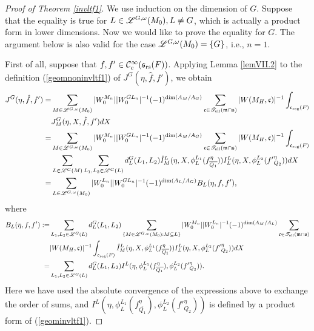 \documentclass[a4paper]{amsart}
\newcommand{\fm}{{\mathfrak{m}}} \newcommand{\fn}{{\mathfrak{n}}}\newcommand{\fo}{{\mathfrak{o}}} \newcommand{\fp}{{\mathfrak{p}}}
\newcommand{\ov}{\overline}
\theoremstyle{definition}
\theoremstyle{remark}
\numberwithin{equation}{subsection}
\begin{document}
\begin{proof}[Proof of Theorem \ref{invltf1}]
We use induction on the dimension of $G$. Suppose that the equality is true for $L\in\mathscr{L}^{G,\omega}(M_0), L\neq G$, which is actually a product form in lower dimensions. Now we would like to prove the equality for $G$. The argument below is also valid for the case $\mathscr{L}^{G,\omega}(M_0)=\{G\}$, i.e., $n=1$. 

First of all, suppose that $f, f'\in{\mathcal {C}}_c^\infty({\mathfrak{s}}_{\mathrm{rs}}(F))$. Applying Lemma \ref{lemVII.2} to the definition (\ref{geomnoninvltf1}) of $J^G(\eta, \hat{f}, f')$, we obtain
\[\begin{split}
 J^G(\eta, \hat{f}, f')=&\sum_{M\in\msl^{G,\omega}(M_0)} |W_0^{M_n}| |W_0^{GL_n}|^{-1} (-1)^{\dim(A_M/A_G)} \sum_{\fc\in\mst_\el(\fm\cap\fs)} |W(M_H, \fc)|^{-1} \int_{\fc_\reg(F)} \\
&J_M^G(\eta, X, \hat{f}, f') dX \\
=&\sum_{M\in\msl^{G,\omega}(M_0)} |W_0^{M_n}| |W_0^{GL_n}|^{-1} (-1)^{\dim(A_M/A_G)} \sum_{\fc\in\mst_\el(\fm\cap\fs)} |W(M_H, \fc)|^{-1} \int_{\fc_\reg(F)} \\
&\sum_{L\in\msl^G(M)} \sum_{L_1,L_2\in\msl^G(L)} d_L^G(L_1,L_2) \hat{I}_M^L(\eta, X, \phi_L^{L_1}(f_{\ov{Q_1}}^\eta)) I_L^L(\eta, X,\phi_L^{L_2}({f'}_{Q_2}^\eta)) dX \\
=&\sum_{L\in\msl^{G,\omega}(M_0)} |W_0^{L_n}| |W_0^{GL_n}|^{-1} (-1)^{\dim(A_L/A_G)} B_L(\eta, f, f'), 
\end{split}\]
where
\[\begin{split}
B_L(\eta, f, f'):=&\sum_{L_1,L_2\in\msl^G(L)} d_L^G(L_1,L_2) \sum_{\{M\in\msl^{G,\omega}(M_0): M\subseteq L\}} |W_0^{M_n}| |W_0^{L_n}|^{-1} (-1)^{\dim(A_M/A_L)} \sum_{\fc\in\mst_\el(\fm\cap\fs)} \\
&|W(M_H, \fc)|^{-1} \int_{\fc_\reg(F)} \hat{I}_M^L(\eta, X, \phi_L^{L_1}(f_{\ov{Q_1}}^\eta)) I_L^L(\eta, X,\phi_L^{L_2}({f'}_{Q_2}^\eta)) dX \\
=&\sum_{L_1,L_2\in\msl^G(L)} d_L^G(L_1,L_2) I^L(\eta, \phi_L^{L_1}(f_{\ov{Q_1}}^\eta), \phi_L^{L_2}({f'}_{Q_2}^\eta)). 
\end{split}\]
Here we have used the absolute convergence of the expressions above to exchange the order of sums, and $I^L(\eta, \phi_L^{L_1}(f_{\ov{Q_1}}^\eta), \phi_L^{L_2}({f'}_{Q_2}^\eta))$ is defined by a product form of (\ref{geominvltf1}). 


\end{proof}
\end{document}
